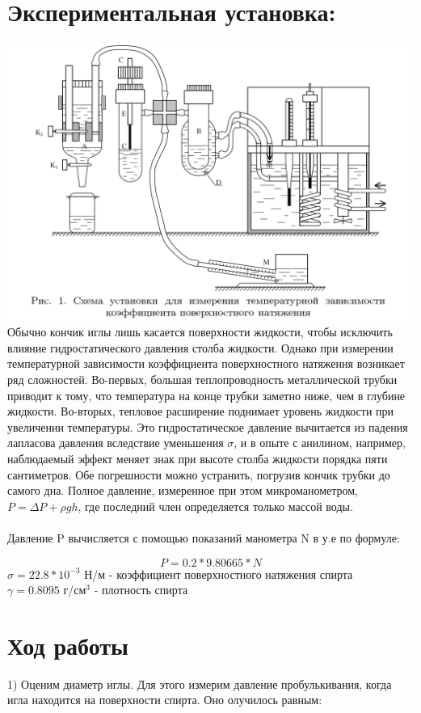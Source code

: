 \documentclass[a4paper,12pt]{article} %
\begin{document}
\section{Экспериментальная установка:}
\includegraphics[scale=0.7]{ust}
 Обычно кончик иглы лишь касается поверхности жидкости, чтобы исключить влияние гидростатического давления столба жидкости. Однако при измерении температурной зависимости коэффициента поверхностного натяжения возникает ряд сложностей. Во-первых, большая теплопроводность металлической трубки приводит к тому, что температура на конце трубки заметно ниже, чем в глубине жидкости. Во-вторых, тепловое расширение поднимает уровень жидкости при увеличении температуры. Это гидростатическое давление вычитается из падения лапласова давления вследствие уменьшения $\sigma$, и в опыте с анилином, например, наблюдаемый эффект меняет знак при высоте столба жидкости порядка пяти сантиметров. Обе погрешности можно устранить, погрузив кончик трубки до самого дна. Полное давление, измеренное при этом микроманометром, $P = \Delta P + \rho gh $, где последний член определяется только массой воды.\\
\ \\
Давление P вычисляется с помощью показаний манометра N в у.е по формуле:

$$P=0.2*9.80665*N$$
$\sigma=22.8*10^{-3}$ Н/м - коэффициент поверхностного натяжения спирта\\
$\gamma = 0.8095$ г/см$^3$ - плотность спирта
\section{Ход работы}
1) Оценим диаметр иглы. Для этого измерим давление пробулькивания, когда игла находится на поверхности спирта. Оно олучилось равным:
\end{document}
